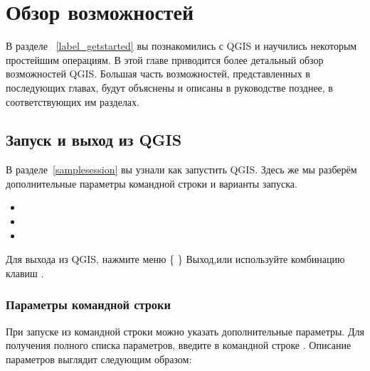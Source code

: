 
\chapter{Обзор возможностей}\label{feature_glance}


В разделе ~\ref{label_getstarted} вы познакомились с QGIS и научились
некоторым простейшим операциям. В этой главе приводится более детальный обзор
возможностей QGIS. Большая часть возможностей, представленных в последующих
главах, будут объяснены и описаны в руководстве позднее, в соответствующих им
разделах.

\section{Запуск и выход из QGIS}\label{label_startinqgis}

В разделе~\ref{samplesession} вы узнали как запустить QGIS. Здесь же мы разберём
дополнительные параметры командной строки и варианты запуска.

\begin{itemize}
\item {}
\item {}
\item {}
\end{itemize}

Для выхода из QGIS, нажмите меню \{\nix{} \} \arrow
Выход,или используйте комбинацию клавиш .

\subsection{Параметры командной строки}
\label{label_commandline}

\nix При запуске \qg из командной строки можно указать дополнительные параметры.
Для получения полного списка параметров, введите в командной строке
. Описание параметров выглядит следующим образом:


